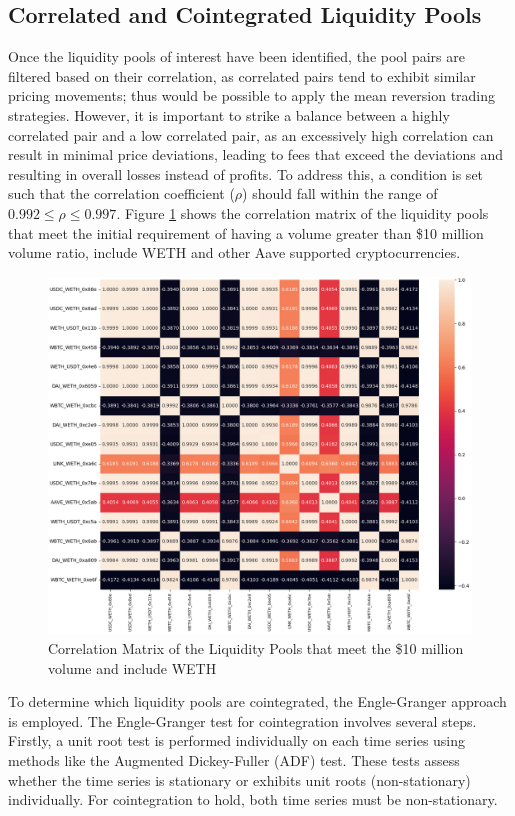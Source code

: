 \subsection{Correlated and Cointegrated Liquidity Pools}
Once the liquidity pools of interest have been identified, the pool pairs are filtered based on their correlation, as correlated pairs tend to exhibit similar pricing movements; thus would be possible to apply the mean reversion trading strategies. However, it is important to strike a balance between a highly correlated pair and a low correlated pair, as an excessively high correlation can result in minimal price deviations, leading to fees that exceed the deviations and resulting in overall losses instead of profits. To address this, a condition is set such that the correlation coefficient ($\rho$) should fall within the range of $0.992 \leq \rho \leq 0.997$. Figure \ref{fig:correlationMatrix} shows the correlation matrix of the liquidity pools that meet the initial requirement of having a volume greater than \$10 million volume ratio, include WETH and other Aave supported cryptocurrencies.
\begin{figure}[!htb]
    \centering
    \includegraphics[width=\textwidth]{project/Images/correlationMatrix.png}
    \caption{Correlation Matrix of the Liquidity Pools that meet the \$10 million volume and include WETH \label{fig:correlationMatrix}}
\end{figure}
To determine which liquidity pools are cointegrated, the Engle-Granger approach is employed. The Engle-Granger test for cointegration involves several steps. Firstly, a unit root test is performed individually on each time series using methods like the Augmented Dickey-Fuller (ADF) test. These tests assess whether the time series is stationary or exhibits unit roots (non-stationary) individually. For cointegration to hold, both time series must be non-stationary.
